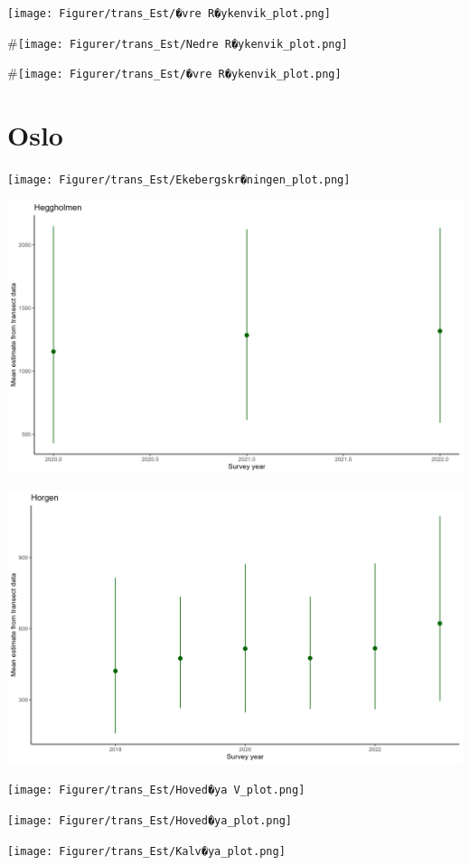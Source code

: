 \documentclass[
  letterpaper,
  DIV=11,
  numbers=noendperiod]{scrreport}
\begin{document}
\texttt{[image: Figurer/trans\_Est/�vre R�ykenvik\_plot.png]}

\#\texttt{[image: Figurer/trans\_Est/Nedre R�ykenvik\_plot.png]}

\#\texttt{[image: Figurer/trans\_Est/�vre R�ykenvik\_plot.png]}

\hypertarget{oslo-3}{%
\section{Oslo}\label{oslo-3}}

\texttt{[image: Figurer/trans\_Est/Ekebergskr�ningen\_plot.png]}

\includegraphics{Figurer/trans_Est/Heggholmen_plot.png}

\includegraphics{Figurer/trans_Est/Horgen_plot.png}

\texttt{[image: Figurer/trans\_Est/Hoved�ya V\_plot.png]}

\texttt{[image: Figurer/trans\_Est/Hoved�ya\_plot.png]}

\texttt{[image: Figurer/trans\_Est/Kalv�ya\_plot.png]}
\end{document}
